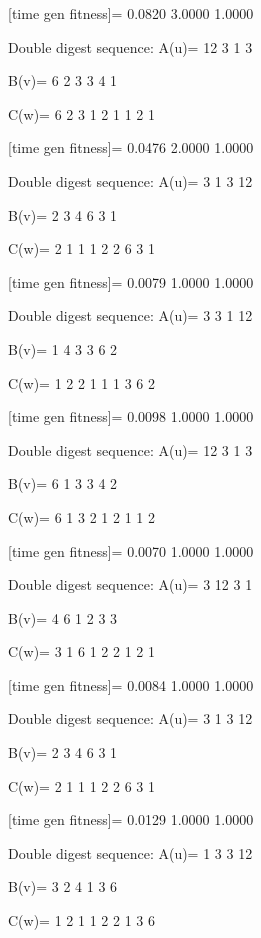 [time gen fitness]=
    0.0820    3.0000    1.0000

Double digest sequence:
A(u)=
    12     3     1     3

B(v)=
     6     2     3     3     4     1

C(w)=
     6     2     3     1     2     1     1     2     1

[time gen fitness]=
    0.0476    2.0000    1.0000

Double digest sequence:
A(u)=
     3     1     3    12

B(v)=
     2     3     4     6     3     1

C(w)=
     2     1     1     1     2     2     6     3     1

[time gen fitness]=
    0.0079    1.0000    1.0000

Double digest sequence:
A(u)=
     3     3     1    12

B(v)=
     1     4     3     3     6     2

C(w)=
     1     2     2     1     1     1     3     6     2

[time gen fitness]=
    0.0098    1.0000    1.0000

Double digest sequence:
A(u)=
    12     3     1     3

B(v)=
     6     1     3     3     4     2

C(w)=
     6     1     3     2     1     2     1     1     2

[time gen fitness]=
    0.0070    1.0000    1.0000

Double digest sequence:
A(u)=
     3    12     3     1

B(v)=
     4     6     1     2     3     3

C(w)=
     3     1     6     1     2     2     1     2     1

[time gen fitness]=
    0.0084    1.0000    1.0000

Double digest sequence:
A(u)=
     3     1     3    12

B(v)=
     2     3     4     6     3     1

C(w)=
     2     1     1     1     2     2     6     3     1

[time gen fitness]=
    0.0129    1.0000    1.0000

Double digest sequence:
A(u)=
     1     3     3    12

B(v)=
     3     2     4     1     3     6

C(w)=
     1     2     1     1     2     2     1     3     6

